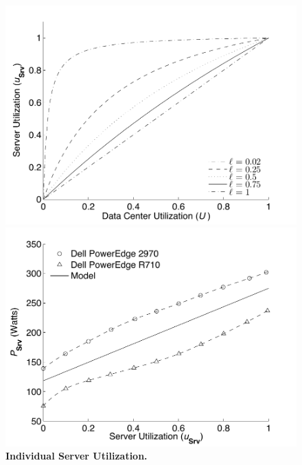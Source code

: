 



\begin{figure}[ht]


\begin{minipage}[b]{.5\linewidth}
  \centering
  \includegraphics[width=\linewidth]{Appendices/WEED/figure/LoadBalancingCoeff.pdf}
  \caption{\textbf{ Individual Server Utilization. }}
  \label{figure::ServerUtilization}
\end{minipage}
\begin{minipage}[b]{0.5\linewidth}
  \centering
  \includegraphics[width = \linewidth]{Appendices/WEED/figure/spec.pdf}

\end{minipage}
\end{figure}

